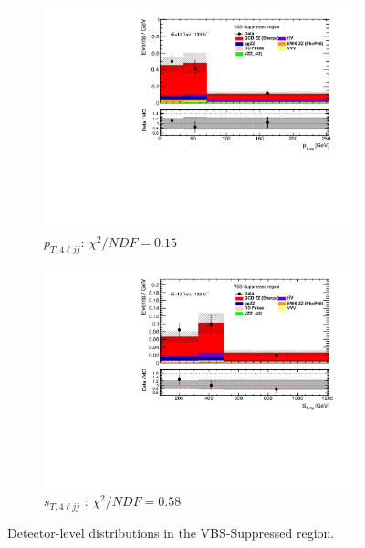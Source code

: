 \begin{figure}[!htb]
\begin{subfigure}{.49\textwidth}
        \includegraphics[width=.98\linewidth]{figures/Results/RecoDist_VBSSuppressed/reco_ptzzjj_CR.pdf}
        \caption{ \footnotesize{$p_{T,4\ell jj}$}: $\chi^2/NDF = 0.15$ }
    \end{subfigure}
    \begin{subfigure}{.49\textwidth}
        \centering
        \includegraphics[width=.98\linewidth]{figures/Results/RecoDist_VBSSuppressed/reco_stzzjj_CR.pdf}
        \caption{ \footnotesize{$s_{T, 4\ell jj}$ }: $\chi^2/NDF = 0.58$ }
    \end{subfigure}
    \caption{Detector-level distributions in the VBS-Suppressed region.}  \label{fig:reco_VBS_Suppressed_a}
\end{figure}

